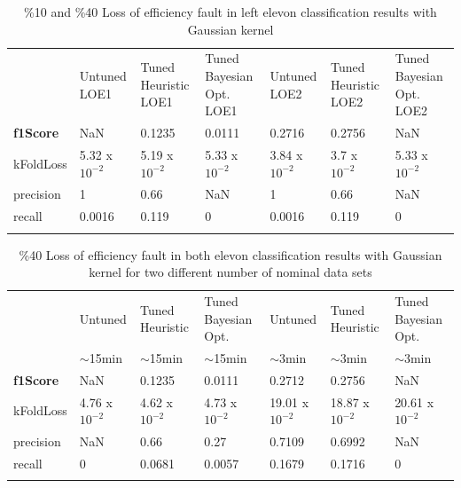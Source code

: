 \begin{table}
\caption{\%10 and \%40 Loss of efficiency fault in left elevon classification results with Gaussian kernel}
\label{tab:loe10_40}       %
\begin{tabular}{p{1.65cm}p{2cm}p{2cm}p{2cm}p{2cm}p{2cm}p{2cm}}
\hline\noalign{\smallskip}
 & Untuned LOE1 & Tuned Heuristic LOE1 & Tuned Bayesian Opt. LOE1& Untuned LOE2 & Tuned Heuristic LOE2 & Tuned Bayesian Opt. LOE2\\
\noalign{\smallskip}\hline\noalign{\smallskip}
\textbf{f1Score} & NaN & 0.1235 & 0.0111 & 0.2716 & 0.2756 & NaN\\
kFoldLoss & 5.32 x $10^{-2}$ &  5.19 x $10^{-2} $&  5.33 x $10^{-2}$ & 3.84 x $10^{-2}$ &  3.7 x $10^{-2} $&  5.33 x $10^{-2}$ \\
precision & 1 & 0.66 & NaN & 1 & 0.66 & NaN\\
recall & 0.0016 & 0.119 & 0  & 0.0016 & 0.119 & 0 \\
\noalign{\smallskip}\hline
\end{tabular}
\end{table}	


\begin{table}
	\centering
\caption{\%40 Loss of efficiency fault in both elevon classification results with Gaussian kernel for two different number of nominal data sets}
\label{tab:loe40_decreasedNumNomMeas}       %
\begin{tabular}{p{1.65cm}p{2cm}p{2cm}p{2cm}p{2.2cm}p{2.2cm}p{2.2cm}}
\hline\noalign{\smallskip}
 & Untuned & Tuned Heuristic  & Tuned Bayesian Opt. & Untuned& Tuned Heuristic  & Tuned Bayesian Opt. \\
 & $\sim$15min & $\sim$15min & $\sim$15min &  $\sim$3min & $\sim$3min & $\sim$3min\\
\noalign{\smallskip}\hline\noalign{\smallskip}
\textbf{f1Score} & NaN & 0.1235 & 0.0111 & 0.2712 & 0.2756 & NaN\\
kFoldLoss & 4.76 x $10^{-2}$ &  4.62 x $10^{-2} $&  4.73 x $10^{-2}$ & 19.01 x $10^{-2}$ &  18.87 x $10^{-2} $&  20.61 x $10^{-2}$ \\
precision & NaN & 0.66 & 0.27 & 0.7109 & 0.6992 & NaN\\
recall & 0 & 0.0681 & 0.0057  & 0.1679 & 0.1716 & 0 \\
\noalign{\smallskip}\hline
\end{tabular}
\end{table}

